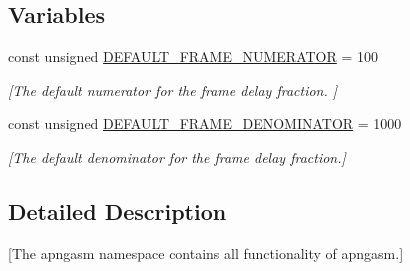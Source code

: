 \subsection*{Variables}
\begin{DoxyCompactItemize}
\item 
\hypertarget{namespaceapngasm_a5b334b6957e14291ff8f76cab562f60f}{const unsigned \hyperlink{namespaceapngasm_a5b334b6957e14291ff8f76cab562f60f}{D\-E\-F\-A\-U\-L\-T\-\_\-\-F\-R\-A\-M\-E\-\_\-\-N\-U\-M\-E\-R\-A\-T\-O\-R} = 100}\label{namespaceapngasm_a5b334b6957e14291ff8f76cab562f60f}

\begin{DoxyCompactList}\small\item\em \mbox{[}The default numerator for the frame delay fraction. \mbox{]} \end{DoxyCompactList}\item 
\hypertarget{namespaceapngasm_a867b3acbcc2624faf6b3e82732110594}{const unsigned \hyperlink{namespaceapngasm_a867b3acbcc2624faf6b3e82732110594}{D\-E\-F\-A\-U\-L\-T\-\_\-\-F\-R\-A\-M\-E\-\_\-\-D\-E\-N\-O\-M\-I\-N\-A\-T\-O\-R} = 1000}\label{namespaceapngasm_a867b3acbcc2624faf6b3e82732110594}

\begin{DoxyCompactList}\small\item\em \mbox{[}The default denominator for the frame delay fraction.\mbox{]} \end{DoxyCompactList}\end{DoxyCompactItemize}


\subsection{Detailed Description}
\mbox{[}The apngasm namespace contains all functionality of apngasm.\mbox{]} 